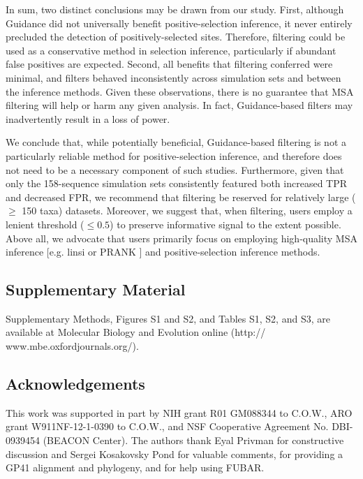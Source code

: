 \documentclass[11pt]{article}
\begin{document}
In sum, two distinct conclusions may be drawn from our study. First, although Guidance did not universally benefit positive-selection inference, it never entirely precluded the detection of positively-selected sites. Therefore, filtering could be used as a conservative method in selection inference, particularly if abundant false positives are expected. Second, all benefits that filtering conferred were minimal, and filters behaved inconsistently across simulation sets and between the inference methods. Given these observations, there is no guarantee that MSA filtering will help or harm any given analysis. In fact, Guidance-based filters may inadvertently result in a loss of power. 

We conclude that, while potentially beneficial, Guidance-based filtering is not a particularly reliable method for positive-selection inference, and therefore does not need to be a necessary component of such studies. Furthermore, given that only the 158-sequence simulation sets consistently featured both increased TPR and decreased FPR, we recommend that filtering be reserved for relatively large ($\geq$ 150 taxa) datasets. Moreover, we suggest that, when filtering, users employ a lenient threshold ($\leq0.5$) to preserve informative signal to the extent possible. Above all, we advocate that users primarily focus on employing high-quality MSA inference [e.g. linsi \citep{Katoh2005} or PRANK \citep{Loytynoja2008}] and positive-selection inference methods. 


\subsection*{Supplementary Material}
Supplementary Methods, Figures S1 and S2, and Tables S1, S2, and S3, are available at Molecular Biology and Evolution online (http:// www.mbe.oxfordjournals.org/).


\subsection*{Acknowledgements}
 This work was supported in part by NIH grant R01 GM088344 to C.O.W., ARO grant W911NF-12-1-0390 to  C.O.W.,  and NSF Cooperative Agreement No. DBI-0939454 (BEACON Center). The authors thank Eyal Privman for constructive discussion and Sergei Kosakovsky Pond for valuable comments, for providing a GP41 alignment and phylogeny, and for help using FUBAR.


%
%	
\newpage
\end{document}
